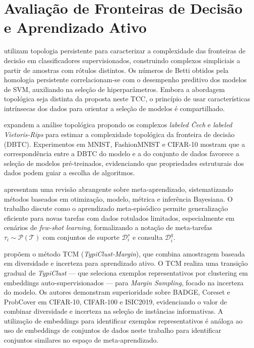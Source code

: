 \section{Avaliação de Fronteiras de Decisão e Aprendizado Ativo}
\label{sec:relFronteirasAtivo}

 utilizam topologia persistente para caracterizar a complexidade das fronteiras de decisão em classificadores supervisionados, construindo complexos simpliciais a partir de amostras com rótulos distintos. Os números de Betti obtidos pela homologia persistente correlacionam-se com o desempenho preditivo dos modelos de SVM, auxiliando na seleção de hiperparâmetros. Embora a abordagem topológica seja distinta da proposta neste TCC, o princípio de usar características intrínsecas dos dados para orientar a seleção de modelos é compartilhado.

 expandem a análise topológica propondo os complexos \textit{labeled Čech} e \textit{labeled Vietoris-Rips} para estimar a complexidade topológica da fronteira de decisão (DBTC). Experimentos em MNIST, FashionMNIST e CIFAR-10 mostram que a correspondência entre a DBTC do modelo e a do conjunto de dados favorece a seleção de modelos pré-treinados, evidenciando que propriedades estruturais dos dados podem guiar a escolha de algoritmos.

 apresentam uma revisão abrangente sobre meta-aprendizado, sistematizando métodos baseados em otimização, modelo, métrica e inferência Bayesiana. O trabalho discute como o aprendizado meta-episódico permite generalização eficiente para novas tarefas com dados rotulados limitados, especialmente em cenários de \textit{few-shot learning}, formalizando a notação de meta-tarefas $\tau_i \sim \mathcal{P}(\mathcal{T})$ com conjuntos de suporte $\mathcal{D}^s_i$ e consulta $\mathcal{D}^q_i$.

 propõem o método TCM (\textit{TypiClust-Margin}), que combina amostragem baseada em diversidade e incerteza para aprendizado ativo. O TCM realiza uma transição gradual de \textit{TypiClust} — que seleciona exemplos representativos por clustering em embeddings auto-supervisionados — para \textit{Margin Sampling}, focado na incerteza do modelo. Os autores demonstram superioridade sobre BADGE, Coreset e ProbCover em CIFAR-10, CIFAR-100 e ISIC2019, evidenciando o valor de combinar diversidade e incerteza na seleção de instâncias informativas. A utilização de embeddings para identificar exemplos representativos é análoga ao uso de embeddings de conjuntos de dados neste trabalho para identificar conjuntos similares no espaço de meta-aprendizado.

